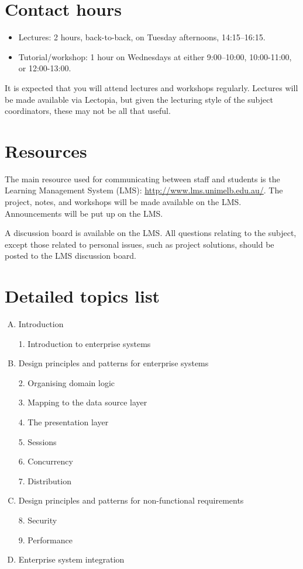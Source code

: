 \section*{Contact hours}

\begin{itemize}

 \item Lectures: 2 hours, back-to-back, on Tuesday afternoons, 14:15--16:15.

 \item Tutorial/workshop: 1 hour on Wednesdays at either 9:00--10:00, 10:00-11:00, or 12:00-13:00.

\end{itemize}

It is expected that you will attend lectures and workshops regularly. Lectures will be made available via Lectopia, but given the lecturing style of the subject coordinators, these may not be all that useful. 

\section*{Resources}

The main resource used for communicating between staff and students is the Learning Management System (LMS): \url{http://www.lms.unimelb.edu.au/}. The project, notes, and workshops will be made available on the LMS. Announcements will be put up on the LMS.

A discussion board is available on the LMS. All questions relating to the subject, except those related to personal issues, such as project solutions, should be posted to the LMS discussion board.

\section*{Detailed topics list}

\begin{enumerate}[A.]

\item Introduction 

 1. Introduction to enterprise systems

\item Design principles and patterns for enterprise systems

 2. Organising domain logic

 3. Mapping to the data source layer

 4. The presentation layer

 5. Sessions

 6. Concurrency

 7. Distribution

\item Design principles and patterns for non-functional requirements

 8. Security

 9. Performance

\item Enterprise system integration

\end{enumerate}


